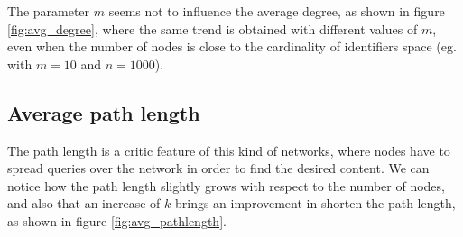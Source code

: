 \documentclass[12pt]{article}
\begin{document}
\noindent
The parameter $m$ seems not to influence the average degree, as shown in figure \ref{fig:avg_degree}, where the same trend is obtained with different values of $m$, even when the number of nodes is close to the cardinality of identifiers space (eg. with $m=10$ and $n=1000$). 

\pagebreak

\subsection{Average path length}

The path length is a critic feature of this kind of networks, where nodes have to spread queries over the network in order to find the desired content. We can notice how the path length slightly grows with respect to the number of nodes, and also that an increase of $k$ brings an improvement in shorten the path length, as shown in figure \ref{fig:avg_pathlength}. 
\end{document}
